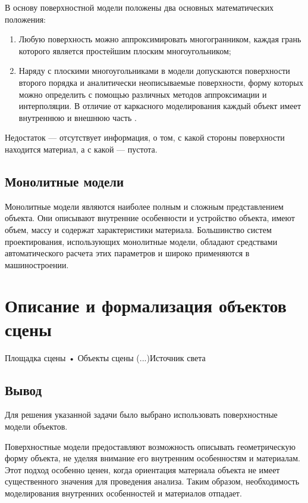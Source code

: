 В основу поверхностной модели положены два основных математических положения:
\begin{enumerate}

\item Любую поверхность можно аппроксимировать
многогранником, каждая грань которого является простейшим плоским
многоугольником;
\item Наряду с плоскими многоугольниками в модели допускаются поверхности второго порядка и аналитически неописываемые поверхности, форму которых можно определить с помощью различных методов аппроксимации и интерполяции. В отличие от каркасного моделирования каждый объект имеет внутреннюю и внешнюю часть \cite{model_geom_01}.
\end{enumerate}


Недостаток --- отсутствует информация, о том, с какой стороны поверхности находится материал, а с какой --- пустота.

\subsection{Монолитные модели}

Монолитные модели являются наиболее полным и сложным представлением объекта. Они описывают внутренние особенности и устройство объекта, имеют объем, массу и содержат характеристики материала. Большинство систем проектирования, использующих монолитные модели, обладают средствами автоматического расчета этих параметров и широко применяются в машиностроении.

\section{ Описание и  формализация  объектов сцены}

Площадка сцены   • Объекты сцены (...)Источник света 
\subsection{Вывод}

Для решения указанной задачи было выбрано использовать  поверхностные модели объектов.

Поверхностные модели предоставляют возможность описывать геометрическую форму объекта, не уделяя внимание его внутренним особенностям и материалам. Этот подход особенно ценен, когда ориентация материала объекта не имеет существенного значения для проведения анализа. Таким образом, необходимость моделирования внутренних особенностей и материалов отпадает.


